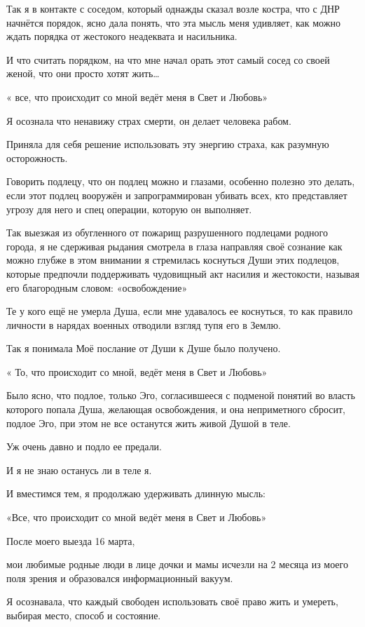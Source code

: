 Так я в контакте с соседом, который однажды сказал возле костра, что с ДНР
начнётся порядок, ясно дала понять, что эта мысль меня удивляет, как можно
ждать порядка от жестокого неадеквата и насильника.

И что считать порядком, на что мне начал орать этот самый сосед со своей женой,
что они просто хотят жить…

« все, что происходит со мной ведёт меня в Свет и Любовь»

Я осознала что ненавижу страх смерти, он делает человека рабом.

Приняла для себя решение использовать эту энергию страха, как разумную
осторожность.

Говорить подлецу, что он подлец можно и глазами, особенно полезно это делать,
если этот подлец вооружён и запрограммирован убивать всех, кто представляет
угрозу для него и спец операции, которую он выполняет.

Так выезжая из обугленного от пожарищ разрушенного подлецами родного города, я
не сдерживая рыдания смотрела в глаза направляя своё сознание как можно глубже
в этом внимании я стремилась коснуться Души этих подлецов, которые предпочли
поддерживать чудовищный акт насилия и жестокости, называя его благородным
словом: «освобождение»

Те у кого ещё не умерла Душа, если мне удавалось ее коснуться, то как правило
личности в нарядах военных отводили взгляд тупя его в Землю.

Так я понимала Моё послание от Души к Душе было получено.

« То, что происходит со мной, ведёт меня в Свет и Любовь»

Было ясно, что подлое, только Эго, согласившееся с подменой понятий во власть
которого попала Душа, желающая освобождения, и она неприметного сбросит, подлое
Эго, при этом не все останутся жить живой Душой в теле.

Уж очень давно и подло ее предали.

И я не знаю останусь ли в теле я.

И вместимся тем, я продолжаю удерживать длинную мысль:

«Все, что происходит со мной ведёт меня в Свет и Любовь»

После моего выезда 16 марта,

мои любимые родные люди в лице дочки и мамы исчезли на 2 месяца из моего поля
зрения и образовался информационный вакуум.

Я осознавала, что каждый свободен использовать своё право жить и умереть,
выбирая место, способ и состояние.

